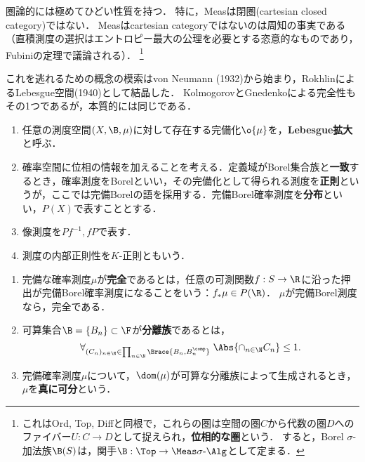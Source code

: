 \documentclass[uplatex,dvipdfmx]{jsreport}
\begin{document}
\begin{observation}[Measの特徴]
    圏論的には極めてひどい性質を持つ．
    特に，Measは閉圏(cartesian closed category)ではない．
    Measはcartesian categoryではないのは周知の事実である（直積測度の選択はエントロピー最大の公理を必要とする恣意的なものであり，Fubiniの定理で議論される）．
    \footnote{これはOrd, Top, Diffと同根で，これらの圏は空間の圏$C$から代数の圏$D$へのファイバー$U:C\to D$として捉えられ，\textbf{位相的な圏}という．
    すると，Borel $\sigma$-加法族$\B(S)$は，関手$\B:\Top\to\Meas\sigma\text{-}\Alg$として定まる．}
\end{observation}
\begin{history}
    これを逃れるための概念の模索はvon Neumann (1932)から始まり，RokhlinによるLebesgue空間(1940)として結晶した．
    KolmogorovとGnedenkoによる完全性もその1つであるが，本質的には同じである．
\end{history}

\begin{notation}\mbox{}
    \begin{enumerate}
        \item 任意の測度空間$(X,\B,\mu)$に対して存在する完備化$\o{\mu}$を，\textbf{Lebesgue拡大}と呼ぶ．
        \item 確率空間に位相の情報を加えることを考える．定義域がBorel集合族と\textbf{一致}するとき，確率測度をBorelといい，その完備化として得られる測度を\textbf{正則}というが，ここでは完備Borelの語を採用する．完備Borel確率測度を\textbf{分布}といい，$P(X)$で表すこととする．
        \item 像測度を$Pf^{-1},fP$で表す．
        \item 測度の内部正則性を$K$-正則ともいう．
    \end{enumerate}
\end{notation}

\begin{definition}\label{def-perfect-measure}\mbox{}
    \begin{enumerate}
        \item 完備な確率測度$\mu$が\textbf{完全}であるとは，任意の可測関数$f:S\to\R$に沿った押出が完備Borel確率測度になることをいう：$f_*\mu\in P(\R)$．
        $\mu$が完備Borel測度なら，完全である．
        \item 可算集合$\B=\{B_n\}\subset\F$が\textbf{分離族}であるとは，
        \[\forall_{(C_n)_{n\in\N}\in\prod_{n\in\N}\Brace{B_n,B_n^\comp}}\;\Abs{\cap_{n\in\N}C_n}\le1.\]
        \item 完備確率測度$\mu$について，$\dom(\mu)$が可算な分離族によって生成されるとき，$\mu$を\textbf{真に可分}という．
    \end{enumerate}
\end{definition}
\end{document}

